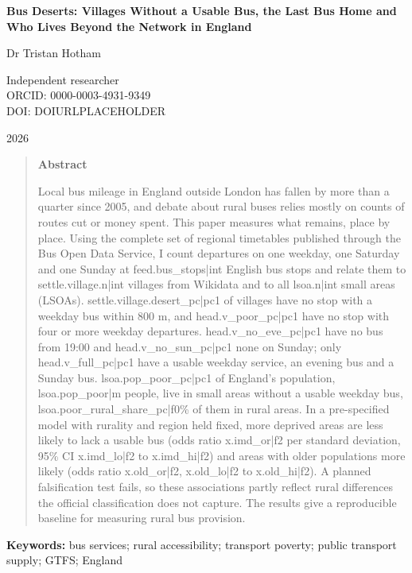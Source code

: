 \documentclass[11pt,a4paper]{article}
\begin{document}
\begin{center}
{\Large\bfseries Bus Deserts: Villages Without a Usable Bus, the Last Bus Home and Who Lives Beyond the Network in England\par}
\vspace{1.2em}
{\large Dr Tristan Hotham\par}
\vspace{0.3em}
{\small Independent researcher\\
ORCID: 0000-0003-4931-9349\\
DOI: DOIURLPLACEHOLDER\par}
\vspace{0.8em}
2026
\end{center}

\begin{quote}
\small
\begin{center}\textbf{Abstract}\end{center}
Local bus mileage in England outside London has fallen by more than a quarter since 2005, and debate about rural buses relies mostly on counts of routes cut or money spent. This paper measures what remains, place by place. Using the complete set of regional timetables published through the Bus Open Data Service, I count departures on one weekday, one Saturday and one Sunday at {{feed.bus_stops|int}} English bus stops and relate them to {{settle.village.n|int}} villages from Wikidata and to all {{lsoa.n|int}} small areas (LSOAs). {{settle.village.desert_pc|pc1}} of villages have no stop with a weekday bus within 800 m, and {{head.v_poor_pc|pc1}} have no stop with four or more weekday departures. {{head.v_no_eve_pc|pc1}} have no bus from 19:00 and {{head.v_no_sun_pc|pc1}} none on Sunday; only {{head.v_full_pc|pc1}} have a usable weekday service, an evening bus and a Sunday bus. {{lsoa.pop_poor_pc|pc1}} of England's population, {{lsoa.pop_poor|m}} people, live in small areas without a usable weekday bus, {{lsoa.poor_rural_share_pc|f0}}\% of them in rural areas. In a pre-specified model with rurality and region held fixed, more deprived areas are less likely to lack a usable bus (odds ratio {{x.imd_or|f2}} per standard deviation, 95\% CI {{x.imd_lo|f2}} to {{x.imd_hi|f2}}) and areas with older populations more likely (odds ratio {{x.old_or|f2}}, {{x.old_lo|f2}} to {{x.old_hi|f2}}). A planned falsification test fails, so these associations partly reflect rural differences the official classification does not capture. The results give a reproducible baseline for measuring rural bus provision.
\end{quote}
{\small\textbf{Keywords:} bus services; rural accessibility; transport poverty; public transport supply; GTFS; England\par}
\end{document}
